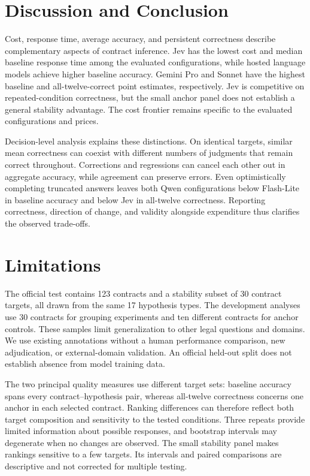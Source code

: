 \documentclass{article}
\begin{document}
\section{Discussion and Conclusion}
\label{sec:conclusion}
Cost, response time, average accuracy, and persistent correctness describe complementary aspects of contract inference. Jev has the lowest cost and median baseline response time among the evaluated configurations, while hosted language models achieve higher baseline accuracy. Gemini Pro and Sonnet have the highest baseline and all-twelve-correct point estimates, respectively. Jev is competitive on repeated-condition correctness, but the small anchor panel does not establish a general stability advantage. The cost frontier remains specific to the evaluated configurations and prices.

Decision-level analysis explains these distinctions. On identical targets, similar mean correctness can coexist with different numbers of judgments that remain correct throughout. Corrections and regressions can cancel each other out in aggregate accuracy, while agreement can preserve errors. Even optimistically completing truncated answers leaves both Qwen configurations below Flash-Lite in baseline accuracy and below Jev in all-twelve correctness. Reporting correctness, direction of change, and validity alongside expenditure thus clarifies the observed trade-offs.

\label{sec:content-end}
\clearpage
\section*{Limitations}
\label{sec:limitations}
The official test contains 123 contracts and a stability subset of 30 contract targets, all drawn from the same 17 hypothesis types. The development analyses use 30 contracts for grouping experiments and ten different contracts for anchor controls. These samples limit generalization to other legal questions and domains. We use existing annotations without a human performance comparison, new adjudication, or external-domain validation. An official held-out split does not establish absence from model training data.

The two principal quality measures use different target sets: baseline accuracy spans every contract--hypothesis pair, whereas all-twelve correctness concerns one anchor in each selected contract. Ranking differences can therefore reflect both target composition and sensitivity to the tested conditions. Three repeats provide limited information about possible responses, and bootstrap intervals may degenerate when no changes are observed. The small stability panel makes rankings sensitive to a few targets. Its intervals and paired comparisons are descriptive and not corrected for multiple testing.
\end{document}
